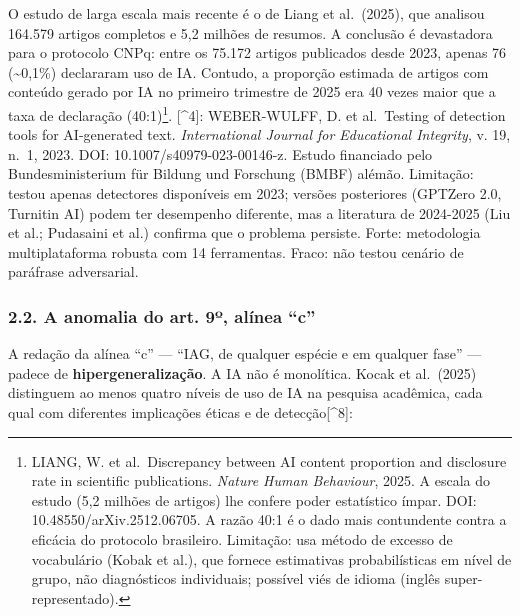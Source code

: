 \documentclass[
  12pt,
  a4paper,
  brazil
]{article}
\begin{document}
O estudo de larga escala mais recente é o de Liang et al.~(2025), que
analisou 164.579 artigos completos e 5,2 milhões de resumos. A conclusão
é devastadora para o protocolo CNPq: entre os 75.172 artigos publicados
desde 2023, apenas 76 (\textasciitilde0,1\%) declararam uso de IA.
Contudo, a proporção estimada de artigos com conteúdo gerado por IA no
primeiro trimestre de 2025 era 40 vezes maior que a taxa de declaração
(40:1)\footnote{LIANG, W. et al.~Discrepancy between AI content
  proportion and disclosure rate in scientific publications.
  \emph{Nature Human Behaviour}, 2025. A escala do estudo (5,2 milhões
  de artigos) lhe confere poder estatístico ímpar. DOI:
  10.48550/arXiv.2512.06705. A razão 40:1 é o dado mais contundente
  contra a eficácia do protocolo brasileiro. Limitação: usa método de
  excesso de vocabulário (Kobak et al.), que fornece estimativas
  probabilísticas em nível de grupo, não diagnósticos individuais;
  possível viés de idioma (inglês super-representado).}. {[}\^{}4{]}:
WEBER-WULFF, D. et al.~Testing of detection tools for AI-generated text.
\emph{International Journal for Educational Integrity}, v. 19, n.~1,
2023. DOI: 10.1007/s40979-023-00146-z. Estudo financiado pelo
Bundesministerium für Bildung und Forschung (BMBF) alémão. Limitação:
testou apenas detectores disponíveis em 2023; versões posteriores
(GPTZero 2.0, Turnitin AI) podem ter desempenho diferente, mas a
literatura de 2024-2025 (Liu et al.; Pudasaini et al.) confirma que o
problema persiste. Forte: metodologia multiplataforma robusta com 14
ferramentas. Fraco: não testou cenário de paráfrase adversarial.

\subsubsection{2.2. A anomalia do art. 9º, alínea
``c''}\label{a-anomalia-do-art.-9uxba-aluxednea-c}

A redação da alínea ``c'' --- ``IAG, de qualquer espécie e em qualquer
fase'' --- padece de \textbf{hipergeneralização}. A IA não é monolítica.
Kocak et al.~(2025) distinguem ao menos quatro níveis de uso de IA na
pesquisa acadêmica, cada qual com diferentes implicações éticas e de
detecção{[}\^{}8{]}:
\end{document}
